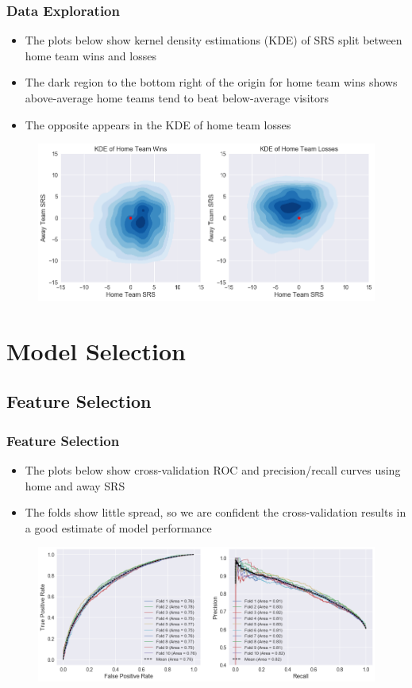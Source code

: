\documentclass{beamer}
\begin{document}
\begin{frame}
\frametitle{Data Exploration}
\begin{itemize}
    \item The plots below show kernel density estimations (KDE) of SRS split between home team wins and losses
    \item The dark region to the bottom right of the origin for home team wins shows above-average home teams tend to beat below-average visitors
    \item The opposite appears in the KDE of home team losses
\end{itemize}
\begin{figure}
\includegraphics[scale=0.35]{../docs/assets/images/data-exploration/srs-win-loss-kde.png}
\end{figure}
\end{frame}

\section{Model Selection}

\subsection{Feature Selection}
\begin{frame}
\frametitle{Feature Selection}
\begin{itemize}
    \item The plots below show cross-validation ROC and precision/recall curves using home and away SRS
    \item The folds show little spread, so we are confident the cross-validation results in a good estimate of model performance
\end{itemize}
\begin{figure}
\includegraphics[scale=0.35]{../docs/assets/images/feature-selection/srs-cross-validation.png}
\end{figure}
\end{frame}
\end{document}
